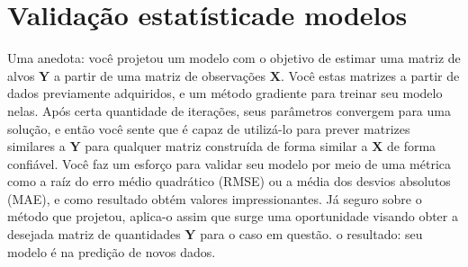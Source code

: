 \begin{algorithm}
        \DIFaddend \end{algorithm}

    \section{Validação estatística\DIFaddbegin {}\DIFaddend de modelos} \label{s:validacao}

      Uma anedota: você projetou um modelo com o objetivo de estimar uma matriz de alvos $\boldsymbol{Y}$ a partir de uma matriz de observações $\boldsymbol{X}$. Você \DIFdelbegin {}\DIFdelend \DIFaddbegin {}\DIFaddend estas matrizes a partir de dados previamente adquiridos, e \DIFdelbegin {}\DIFdelend \DIFaddbegin {}\DIFaddend um método \DIFaddbegin {}\DIFaddend gradiente para treinar seu modelo nelas. Após \DIFdelbegin {}\DIFdelend certa quantidade de iterações, \DIFdelbegin {}\DIFdelend seus parâmetros convergem para uma solução, e então você sente que é capaz de utilizá-lo para prever matrizes similares a $\boldsymbol{Y}$ para qualquer matriz construída de forma similar a $\boldsymbol{X}$ de forma confiável. Você faz um esforço para validar seu modelo por meio de uma métrica como a raíz do erro médio quadrático (RMSE) ou a média dos desvios absolutos (MAE), e como resultado obtém valores impressionantes. Já seguro sobre o método que projetou, aplica-o assim que surge uma oportunidade visando obter a desejada matriz de quantidades $\boldsymbol{Y}$ para o caso em questão. \DIFdelbegin {}\DIFdelend \DIFaddbegin {}\DIFaddend o resultado: seu modelo é \DIFdelbegin {}\DIFdelend \DIFaddbegin {}\DIFaddend na predição de novos dados.

